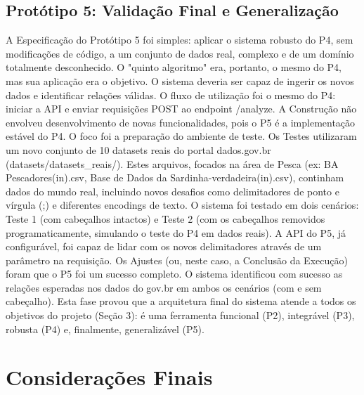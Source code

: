 \documentclass[12pt, a4paper]{article}
\begin{document}
\subsection{Protótipo 5: Validação Final e Generalização} 
\label{subsec:prototipo5}

A Especificação do Protótipo 5 foi simples: aplicar o sistema robusto do P4, sem modificações de código, a um conjunto de dados real, complexo e de um domínio totalmente desconhecido. 
O "quinto algoritmo" era, portanto, o mesmo do P4, mas sua aplicação era o objetivo. 
O sistema deveria ser capaz de ingerir os novos dados e identificar relações válidas. 
O fluxo de utilização foi o mesmo do P4: iniciar a API e enviar requisições POST ao endpoint /analyze. 
A Construção não envolveu desenvolvimento de novas funcionalidades, pois o P5 é a implementação estável do P4. 
O foco foi a preparação do ambiente de teste. 
Os Testes utilizaram um novo conjunto de 10 datasets reais do portal dados.gov.br (datasets/datasets\_reais/). 
Estes arquivos, focados na área de Pesca (ex: BA Pescadores(in).csv, Base de Dados da Sardinha-verdadeira(in).csv), continham dados do mundo real, incluindo novos desafios como delimitadores de ponto e vírgula (;) e diferentes encodings de texto. 
O sistema foi testado em dois cenários: Teste 1 (com cabeçalhos intactos) e Teste 2 (com os cabeçalhos removidos programaticamente, simulando o teste do P4 em dados reais). 
A API do P5, já configurável, foi capaz de lidar com os novos delimitadores através de um parâmetro na requisição. 
Os Ajustes (ou, neste caso, a Conclusão da Execução) foram que o P5 foi um sucesso completo. 
O sistema identificou com sucesso as relações esperadas nos dados do gov.br em ambos os cenários (com e sem cabeçalho).
Esta fase provou que a arquitetura final do sistema atende a todos os objetivos do projeto (Seção 3): é uma ferramenta funcional (P2), integrável (P3), robusta (P4) e, finalmente, generalizável (P5). 

\newpage
\section{Considerações Finais} 
\label{sec:consideracoes-finais}
\end{document}
